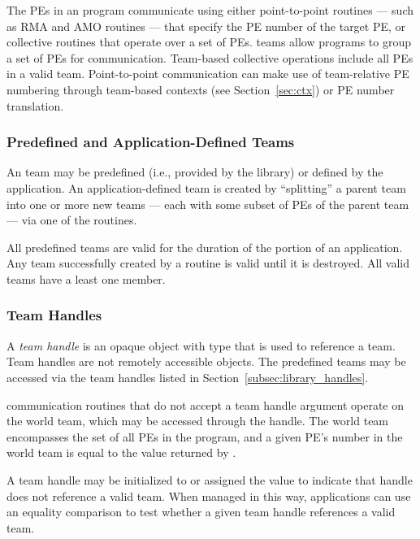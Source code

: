 The \acp{PE} in an \openshmem program communicate using either
point-to-point routines --- such as \ac{RMA} and \ac{AMO} routines --- that specify the \ac{PE} number of the target
\ac{PE}, or collective routines that operate over a set of \acp{PE}.
\openshmem teams allow programs to group a set of \acp{PE} for
communication.
Team-based collective operations include all \acp{PE}
in a valid team.
Point-to-point communication can make use of team-relative \ac{PE}
numbering through team-based contexts (see Section~\ref{sec:ctx}) or
\ac{PE} number translation.

\subsubsection*{Predefined and Application-Defined Teams}

An \openshmem team may be predefined (i.e., provided by the \openshmem
library) or defined by the \openshmem application.
An application-defined team is created by ``splitting'' a parent team into
one or more new teams --- each with some subset of \acp{PE} of the
parent team --- via one of the  routines.

All predefined teams are valid for the duration of the \openshmem
portion of an application.
Any team successfully created by a 
routine is valid until it is destroyed.
All valid teams have a least one member.

\subsubsection*{Team Handles}

A \emph{team handle} is an opaque object with type 
that is used to reference a team.
Team handles are not remotely accessible objects.
The predefined teams may be accessed via the team handles listed in
Section~\ref{subsec:library_handles}.

\openshmem communication routines that do not accept a team handle
argument operate on the world team, which may be accessed through
the  handle.
The world team encompasses the set of all \acp{PE} in the \openshmem
program, and a given \ac{PE}'s number in the world team is equal to the
value returned by .

A team handle may be initialized to or assigned the value
 to indicate that handle does not
reference a valid team.
When managed in this way, applications can use an equality comparison
to test whether a given team handle references a valid team.

